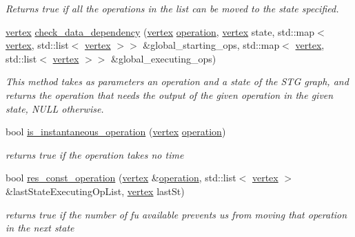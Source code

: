 \begin{DoxyCompactItemize}
\begin{DoxyCompactList}\small\item\em Returns true if all the operations in the list can be moved to the state specified. \end{DoxyCompactList}\item 
\hyperlink{graph_8hpp_abefdcf0544e601805af44eca032cca14}{vertex} \hyperlink{classBB__based__stg_a37ff05a95b3cae65fe5779a3590a52fb}{check\+\_\+data\+\_\+dependency} (\hyperlink{graph_8hpp_abefdcf0544e601805af44eca032cca14}{vertex} \hyperlink{structoperation}{operation}, \hyperlink{graph_8hpp_abefdcf0544e601805af44eca032cca14}{vertex} state, std\+::map$<$ \hyperlink{graph_8hpp_abefdcf0544e601805af44eca032cca14}{vertex}, std\+::list$<$ \hyperlink{graph_8hpp_abefdcf0544e601805af44eca032cca14}{vertex} $>$$>$ \&global\+\_\+starting\+\_\+ops, std\+::map$<$ \hyperlink{graph_8hpp_abefdcf0544e601805af44eca032cca14}{vertex}, std\+::list$<$ \hyperlink{graph_8hpp_abefdcf0544e601805af44eca032cca14}{vertex} $>$$>$ \&global\+\_\+executing\+\_\+ops)
\begin{DoxyCompactList}\small\item\em This method takes as parameters an operation and a state of the S\+TG graph, and returns the operation that needs the output of the given operation in the given state, N\+U\+LL otherwise. \end{DoxyCompactList}\item 
bool \hyperlink{classBB__based__stg_af428643fbc02e8269040fc2ecdb73986}{is\+\_\+instantaneous\+\_\+operation} (\hyperlink{graph_8hpp_abefdcf0544e601805af44eca032cca14}{vertex} \hyperlink{structoperation}{operation})
\begin{DoxyCompactList}\small\item\em returns true if the operation takes no time \end{DoxyCompactList}\item 
bool \hyperlink{classBB__based__stg_a9e4b411f10ee8124e676cfcfa4b4e71d}{res\+\_\+const\+\_\+operation} (\hyperlink{graph_8hpp_abefdcf0544e601805af44eca032cca14}{vertex} \&\hyperlink{structoperation}{operation}, std\+::list$<$ \hyperlink{graph_8hpp_abefdcf0544e601805af44eca032cca14}{vertex} $>$ \&last\+State\+Executing\+Op\+List, \hyperlink{graph_8hpp_abefdcf0544e601805af44eca032cca14}{vertex} last\+St)
\begin{DoxyCompactList}\small\item\em returns true if the number of fu available prevents us from moving that operation in the next state \end{DoxyCompactList}\item 

\end{DoxyCompactItemize}
